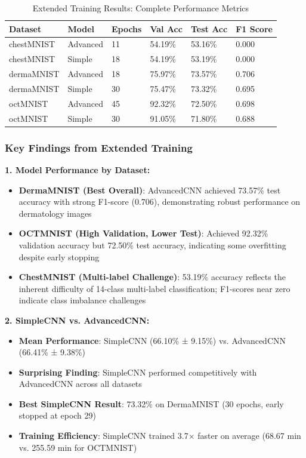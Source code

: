 \documentclass[12pt,a4paper]{article}
\begin{document}
\begin{table}[H]
\centering
\caption{Extended Training Results: Complete Performance Metrics}
\begin{tabular}{@{}llllll@{}}
\toprule
\textbf{Dataset} & \textbf{Model} & \textbf{Epochs} & \textbf{Val Acc} & \textbf{Test Acc} & \textbf{F1 Score} \\ \midrule
chestMNIST & Advanced & 11 & 54.19\% & 53.16\% & 0.000 \\
chestMNIST & Simple & 18 & 54.19\% & 53.19\% & 0.000 \\
dermaMNIST & Advanced & 18 & 75.97\% & 73.57\% & 0.706 \\
dermaMNIST & Simple & 30 & 75.47\% & 73.32\% & 0.695 \\
octMNIST & Advanced & 45 & 92.32\% & 72.50\% & 0.698 \\
octMNIST & Simple & 30 & 91.05\% & 71.80\% & 0.688 \\
\bottomrule
\end{tabular}
\label{tab:extended_results}
\end{table}

\subsubsection{Key Findings from Extended Training}

\textbf{1. Model Performance by Dataset:}
\begin{itemize}
    \item \textbf{DermaMNIST (Best Overall)}: AdvancedCNN achieved 73.57\% test accuracy with strong F1-score (0.706), demonstrating robust performance on dermatology images
    \item \textbf{OCTMNIST (High Validation, Lower Test)}: Achieved 92.32\% validation accuracy but 72.50\% test accuracy, indicating some overfitting despite early stopping
    \item \textbf{ChestMNIST (Multi-label Challenge)}: 53.19\% accuracy reflects the inherent difficulty of 14-class multi-label classification; F1-scores near zero indicate class imbalance challenges
\end{itemize}

\textbf{2. SimpleCNN vs. AdvancedCNN:}
\begin{itemize}
    \item \textbf{Mean Performance}: SimpleCNN (66.10\% ± 9.15\%) vs. AdvancedCNN (66.41\% ± 9.38\%)
    \item \textbf{Surprising Finding}: SimpleCNN performed competitively with AdvancedCNN across all datasets
    \item \textbf{Best SimpleCNN Result}: 73.32\% on DermaMNIST (30 epochs, early stopped at epoch 29)
    \item \textbf{Training Efficiency}: SimpleCNN trained 3.7× faster on average (68.67 min vs. 255.59 min for OCTMNIST)
\end{itemize}
\end{document}
